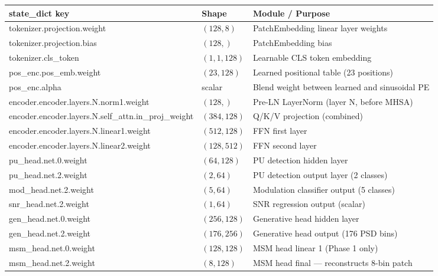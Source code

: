 \documentclass[11pt,a4paper]{article}
\begin{document}
\begin{center}
\renewcommand{\arraystretch}{1.35}
\begin{tabularx}{\textwidth}{>{\ttfamily\footnotesize}l l X}
\toprule
\textbf{state\_dict key} & \textbf{Shape} & \textbf{Module / Purpose} \\
\midrule
tokenizer.projection.weight     & $(128, 8)$       & PatchEmbedding linear layer weights \\
tokenizer.projection.bias       & $(128,)$         & PatchEmbedding bias \\
tokenizer.cls\_token            & $(1, 1, 128)$    & Learnable CLS token embedding \\
pos\_enc.pos\_emb.weight        & $(23, 128)$      & Learned positional table (23 positions) \\
pos\_enc.alpha                  & scalar           & Blend weight between learned and sinusoidal PE \\
encoder.encoder.layers.N.norm1.weight & $(128,)$  & Pre-LN LayerNorm (layer N, before MHSA) \\
encoder.encoder.layers.N.self\_attn.in\_proj\_weight & $(384,128)$ & Q/K/V projection (combined) \\
encoder.encoder.layers.N.linear1.weight & $(512,128)$ & FFN first layer \\
encoder.encoder.layers.N.linear2.weight & $(128,512)$ & FFN second layer \\
pu\_head.net.0.weight           & $(64, 128)$      & PU detection hidden layer \\
pu\_head.net.2.weight           & $(2, 64)$        & PU detection output layer (2 classes) \\
mod\_head.net.2.weight          & $(5, 64)$        & Modulation classifier output (5 classes) \\
snr\_head.net.2.weight          & $(1, 64)$        & SNR regression output (scalar) \\
gen\_head.net.0.weight          & $(256, 128)$     & Generative head hidden layer \\
gen\_head.net.2.weight          & $(176, 256)$     & Generative head output (176 PSD bins) \\
msm\_head.net.0.weight          & $(128, 128)$     & MSM head linear 1 (Phase 1 only) \\
msm\_head.net.2.weight          & $(8, 128)$       & MSM head final — reconstructs 8-bin patch \\
\bottomrule
\end{tabularx}
\end{center}
\end{document}
